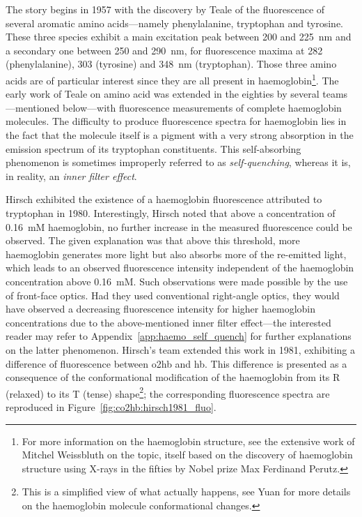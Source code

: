 The story begins in 1957 with the discovery by Teale \etal{} of the fluorescence of several aromatic amino acids---namely phenylalanine, tryptophan and tyrosine\cite{teale1957}. These three species exhibit a main excitation peak between 200 and 225~nm and a secondary one between 250 and 290~nm, for fluorescence maxima at 282 (phenylalanine), 303 (tyrosine) and 348~nm (tryptophan). Those three amino acids are of particular interest since they are all present in haemoglobin\footnote{For more information on the haemoglobin structure, see the extensive work of Mitchel Weissbluth on the topic\cite[Table~1.1]{weissbluth1974}, itself based on the discovery of haemoglobin structure using X-rays in the fifties by Nobel prize Max Ferdinand Perutz\cite{perutz1964}.}. The early work of Teale on amino acid was extended in the eighties by several teams---mentioned below---with fluorescence measurements of complete haemoglobin molecules. The difficulty to produce fluorescence spectra for haemoglobin lies in the fact that the molecule itself is a pigment with a very strong absorption in the emission spectrum of its tryptophan constituents. This self-absorbing phenomenon is sometimes improperly referred to as \emph{self-quenching}, whereas it is, in reality, an \emph{inner filter effect}\cite{elisonhirsch1994}.

Hirsch \etal{} exhibited the existence of a haemoglobin fluorescence attributed to tryptophan in 1980\cite{hirsch1980}. Interestingly, Hirsch noted that above a concentration of 0.16~mM haemoglobin, no further increase in the measured fluorescence could be observed. The given explanation was that above this threshold, more haemoglobin generates more light but also absorbs more of the re-emitted light, which leads to an observed fluorescence intensity independent of the haemoglobin concentration above 0.16~mM. Such observations were made possible by the use of front-face optics. Had they used conventional right-angle optics, they would have observed a decreasing fluorescence intensity for higher haemoglobin concentrations due to the above-mentioned inner filter effect---the interested reader may refer to Appendix~\ref{app:haemo_self_quench} for further explanations on the latter phenomenon. Hirsch's team extended this work in 1981\cite{hirsch1981}, exhibiting a difference of fluorescence between \gls{o2hb} and \gls{hb}. This difference is presented as a consequence of the conformational modification of the haemoglobin from its R (relaxed) to its T (tense) shape\footnote{This is a simplified view of what actually happens, see Yuan \etal{} for more details on the haemoglobin molecule conformational changes\cite{yuan2015}.}; the corresponding fluorescence spectra are reproduced in Figure~\ref{fig:co2hb:hirsch1981_fluo}.

